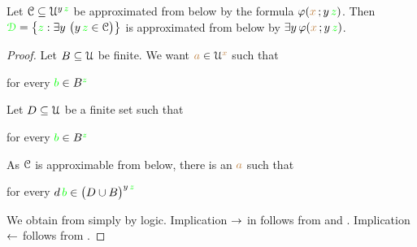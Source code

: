 % 
% 
% 
% 
% 
% 
% 
% 
% 

\begin{proposition}\label{prop_sh_exp_qe}
Let $\EuScript C\subseteq\EuScript U^{y\,{\color{green} z}}$ be approximated from below by the formula $\varphi({\color{brown} x}\,;y\,{\color{green} z})$.
Then ${\color{green}\EuScript D}=\big\{{\color{green} z}:\exists y\ \big(y\,{\color{green} z}\in\EuScript C\big)\big\}$ is approximated from below by $\exists y\,\varphi({\color{brown} x}\,;y\,{\color{green} z})$.
\end{proposition}

\begin{proof}
Let $B\subseteq\EuScript U$ be finite.
We want ${\color{brown} a}\in\EuScript U^{\color{brown} x}$ such that

\hfill for every ${\color{green} b}\in B^{\color{green} z}$


Let $D\subseteq\EuScript U$ be a finite set such that 

\hfill for every ${\color{green} b}\in B^{\color{green} z}$

As $\EuScript C$ is approximable from below, there is an ${\color{brown} a}$ such that

\hfill for every $d\,{\color{green} b}\in \big(D\cup B\big)^{y\,{\color{green} z}}$


We obtain  from  simply by logic.
Implication $\rightarrow$ in  follows from  and .
Implication $\leftarrow$ follows from .
\end{proof}

